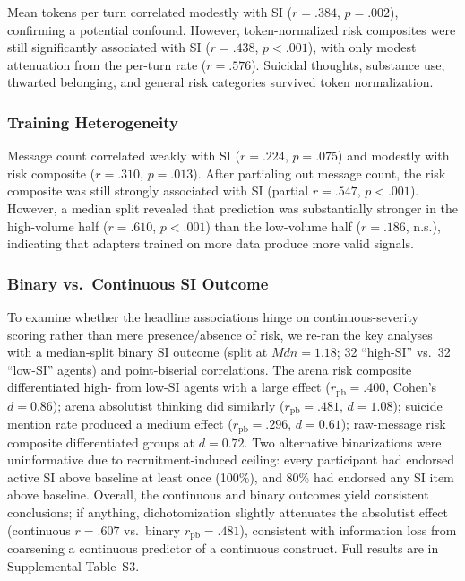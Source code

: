 \documentclass[review,12pt,authoryear]{elsarticle}
\begin{document}
Mean tokens per turn correlated modestly with SI ($r = .384$, $p = .002$), confirming a potential confound. However, token-normalized risk composites were still significantly associated with SI ($r = .438$, $p < .001$), with only modest attenuation from the per-turn rate ($r = .576$). Suicidal thoughts, substance use, thwarted belonging, and general risk categories survived token normalization.

\subsubsection{Training Heterogeneity}

Message count correlated weakly with SI ($r = .224$, $p = .075$) and modestly with risk composite ($r = .310$, $p = .013$). After partialing out message count, the risk composite was still strongly associated with SI (partial $r = .547$, $p < .001$). However, a median split revealed that prediction was substantially stronger in the high-volume half ($r = .610$, $p < .001$) than the low-volume half ($r = .186$, n.s.), indicating that adapters trained on more data produce more valid signals.

\subsubsection{Binary vs.\ Continuous SI Outcome}

To examine whether the headline associations hinge on continuous-severity scoring rather than mere presence/absence of risk, we re-ran the key analyses with a median-split binary SI outcome (split at $Mdn = 1.18$; 32 ``high-SI'' vs.\ 32 ``low-SI'' agents) and point-biserial correlations. The arena risk composite differentiated high- from low-SI agents with a large effect ($r_{\text{pb}} = .400$, Cohen's $d = 0.86$); arena absolutist thinking did similarly ($r_{\text{pb}} = .481$, $d = 1.08$); suicide mention rate produced a medium effect ($r_{\text{pb}} = .296$, $d = 0.61$); raw-message risk composite differentiated groups at $d = 0.72$. Two alternative binarizations were uninformative due to recruitment-induced ceiling: every participant had endorsed active SI above baseline at least once (100\%), and 80\% had endorsed any SI item above baseline. Overall, the continuous and binary outcomes yield consistent conclusions; if anything, dichotomization slightly attenuates the absolutist effect (continuous $r = .607$ vs.\ binary $r_{\text{pb}} = .481$), consistent with information loss from coarsening a continuous predictor of a continuous construct. Full results are in Supplemental Table~S3.
\end{document}
